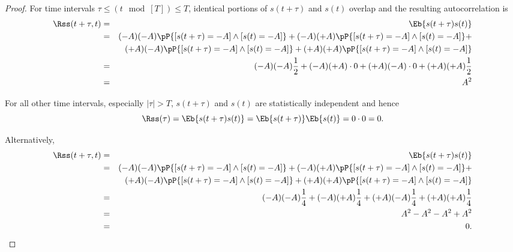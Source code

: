 \begin{proof}
For time intervals $\tau \le (t\mod[T])\le T$, 
identical portions of $s(t+\tau)$ and $s(t)$
overlap and the resulting autocorrelation is
\begin{eqnarray*}
   \Rss(t+\tau,t) 
     &=& \Eb{s(t+\tau)s(t)} 
   \\&=& (-A)(-A)\pP{[s(t+\tau)=-A]\land [s(t)=-A]} + 
         (-A)(+A)\pP{[s(t+\tau)=-A]\land [s(t)=-A]} + \\&&
         (+A)(-A)\pP{[s(t+\tau)=-A]\land [s(t)=-A]} + 
         (+A)(+A)\pP{[s(t+\tau)=-A]\land [s(t)=-A]} 
   \\&=& (-A)(-A)\frac{1}{2} + 
         (-A)(+A)\cdot 0 +
         (+A)(-A)\cdot 0 +
         (+A)(+A)\frac{1}{2} 
   \\&=& A^2
\end{eqnarray*}

For all other time intervals, especially $|\tau|>T$,
$s(t+\tau)$ and $s(t)$ are statistically independent and hence
 \[ \Rss(\tau) = \Eb{s(t+\tau)s(t)} = \Eb{s(t+\tau)}\Eb{s(t)} = 0\cdot0 = 0.\]

Alternatively,
\begin{eqnarray*}
   \Rss(t+\tau,t) 
     &=& \Eb{s(t+\tau)s(t)} 
   \\&=& (-A)(-A)\pP{[s(t+\tau)=-A]\land [s(t)=-A]} + 
         (-A)(+A)\pP{[s(t+\tau)=-A]\land [s(t)=-A]} + \\&&
         (+A)(-A)\pP{[s(t+\tau)=-A]\land [s(t)=-A]} + 
         (+A)(+A)\pP{[s(t+\tau)=-A]\land [s(t)=-A]} 
   \\&=& (-A)(-A)\frac{1}{4} + 
         (-A)(+A)\frac{1}{4} +
         (+A)(-A)\frac{1}{4} +
         (+A)(+A)\frac{1}{4} 
   \\&=& A^2 -A^2 -A^2 + A^2
   \\&=& 0.
\end{eqnarray*}

\end{proof}



